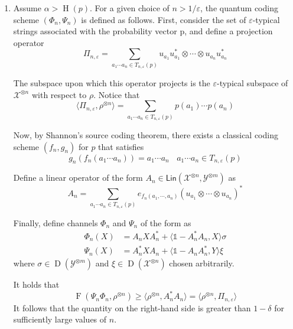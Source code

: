 \documentclass[aps,pra,onecolumn,notitlepage,superscriptaddress]{revtex4-1}
\newcommand{\spc}[1]{\mathcal{#1}}
\newcommand{\Lin}{\mathsf{Lin}}
\def\>{\rangle}
\def\<{\langle}
\newcommand{\op}[1]{\operatorname{#1}}
\newcommand\I{\mathds{1}}
\begin{document}
    \begin{enumerate}
        \item Assume $\alpha > \op H(p)$. For a given choice of $n > 1/\varepsilon$, the quantum coding scheme $(\Phi_n, \Psi_n)$ is defined as follows. First, consider the set of $\varepsilon$-typical strings associated with the probability vector p, and define a projection operator
        \begin{equation}
            \Pi_{n, \varepsilon} = \sum_{a_1 \cdots a_n \in T_{n,\varepsilon}(p)} u_{a_1}u_{a_1}^* \otimes \cdots \otimes u_{a_n}u_{a_n}^*
        \end{equation}
    
        The subspace upon which this operator projects is the $\varepsilon$-typical subspace of $\spc X^{\otimes n}$ with respect to $\rho$. Notice that
        \begin{equation}
            \< \Pi_{n,\varepsilon}, \rho^{\otimes n} \> = \sum_{a_1 \cdots a_n \in T_{n,\varepsilon}(p)} p(a_1) \cdots p(a_n)
        \end{equation}
    
        Now, by Shannon's source coding theorem, there exists a classical coding scheme $(f_n, g_n)$ for $p$ that satisfies
        \begin{equation}
            g_n(f_n(a_1 \cdots a_n)) = a_1 \cdots a_n \ \ \ \ a_1 \cdots a_n \in T_{n,\varepsilon}(p)
        \end{equation}
    
        Define a linear operator of the form $A_n \in \Lin(\spc X^{\otimes n}, \spc Y^{\otimes m})$ as
        \begin{equation}
            A_n = \sum_{a_1 \cdots a_n \in T_{n,\varepsilon}(p)} e_{f_n(a_1, \cdots, a_n)}(u_{a_1} \otimes \cdots \otimes u_{a_n})^*
        \end{equation} 
    
        Finally, define channels $\Phi_n$ and $\Psi_n$ of the form as
        \begin{align*}
            \Phi_n(X) &= A_nXA_n^* + \< \I-A_n^*A_n, X \> \sigma \\
            \Psi_n(X) &= A_n^*XA_n + \< \I-A_nA_n^*, Y \> \xi
        \end{align*}
        where $\sigma \in \op D(\spc Y^{\otimes m})$ and $\xi \in \op D(\spc X^{\otimes n})$ chosen arbitrarily.

        It holds that
        \begin{equation}
            \op F(\Psi_n\Phi_n, \rho^{\otimes n}) \geq \< \rho^{\otimes n}, A_n^*A_n \> = \< \rho^{\otimes n}, \Pi_{n, \varepsilon} \>
        \end{equation}
        It follows that the quantity on the right-hand side is greater than $1 - \delta$ for sufficiently large values of $n$.


\end{enumerate}
\end{document}

